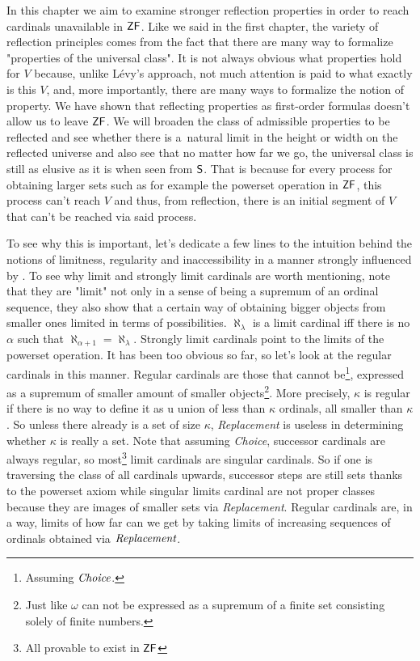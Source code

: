 \documentclass[12pt,a4paper]{article}
\begin{document}
In this chapter we aim to examine stronger reflection properties in order to reach cardinals unavailable in $\sf{ZF}$. Like we said in the first chapter, %
the variety of reflection principles comes from the fact that there are many way to formalize "properties of the universal class". It is not always obvious what properties hold for $V$ because, unlike Lévy's approach, not much attention is paid to what exactly is this $V$, and, more importantly, there are many ways to formalize the notion of property. We have shown that reflecting properties as first-order formulas doesn't allow us to leave $\sf{ZF}$. We will broaden the class of admissible properties to be reflected and see whether there is a~natural limit in the height or width on the reflected universe and also see that no matter how far we go, the universal class is still as elusive as it is when seen from $\sf{S}$. That is because for every process for obtaining larger sets such as for example the powerset operation in $\sf{ZF}$, this process can't reach $V$ and thus, from reflection, there is an initial segment of $V$ that can't be reached via said process. 

To see why this is important, let's dedicate a few lines to the intuition behind the notions of limitness, regularity and inaccessibility in a manner strongly influenced by \cite{Infinity_in_mind}. To see why limit and strongly limit cardinals are worth mentioning, note that they are "limit" not only in a sense of being a supremum of an ordinal sequence, they also show that a certain way of obtaining bigger objects from smaller ones limited in terms of possibilities. $\aleph_\lambda$ is a limit cardinal iff there is no $\alpha$ such that $\aleph_{\alpha+1}=\aleph_\lambda$. Strongly limit cardinals point to the limits of the powerset operation. It has been too obvious so far, so let's look at the regular cardinals in this manner. Regular cardinals are those that cannot be\footnote{Assuming $\emph{Choice}$.}, expressed as a supremum of smaller amount of smaller objects\footnote{Just like $\omega$ can not be expressed as a supremum of a finite set consisting solely of finite numbers.}. More precisely, $\kappa$ is regular if there is no way to define it as u union of less than $\kappa$ ordinals, all smaller than $\kappa$. So unless there already is a set of size $\kappa$, \emph{Replacement} is useless in determining whether $\kappa$ is really a set. Note that assuming \emph{Choice}, successor cardinals are always regular, so most\footnote{All provable to exist in $\sf{ZF}$} limit cardinals are singular cardinals. So if one is traversing the class of all cardinals upwards, successor steps are still sets thanks to the powerset axiom while singular limits cardinal are not proper classes because they are images of smaller sets via \emph{Replacement}. Regular cardinals are, in a way, limits of how far can we get by taking limits of increasing sequences of ordinals obtained via $\emph{Replacement}$.
\end{document}
